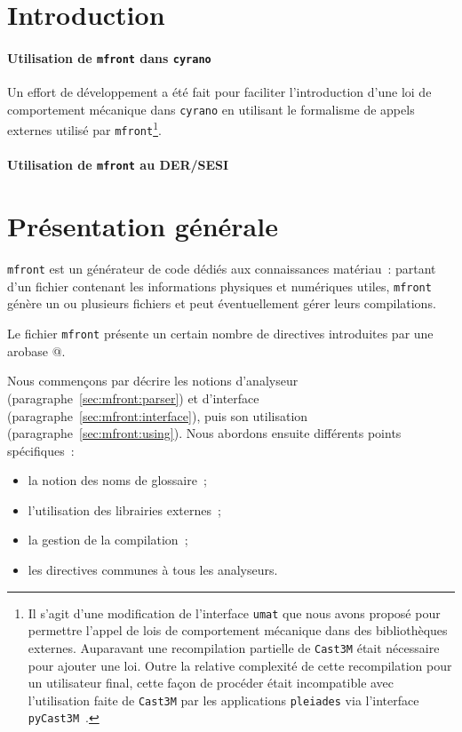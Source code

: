\documentclass[rectoverso,pleiades,pstricks,leqno,anti]{texmf/note_technique_2010}
\newcommand{\pleiades}{\texttt{pleiades}}
\newcommand{\mfront}{\texttt{mfront}}
\newcommand{\cyrano}{\texttt{cyrano}}
\newcommand{\castem}{\texttt{Cast3M}}
\newcommand{\pycastem}{\texttt{pyCast3M}}
\newcommand{\umat}{\texttt{umat}}
\def\ifmonospace{\ifdim\fontdimen3\font=0pt }
\def\cpp{%
\ifmonospace%
    C++%
\else%
    C\kern-.1667em\raise.30ex\hbox{\smaller{++}}%
\fi%
\spacefactor1000 }
\begin{document}
\clearpage
\newpage
\section{Introduction}

\paragraph{Utilisation de \mfront{} dans \cyrano{}}

Un effort de développement a été fait pour faciliter l'introduction
d'une loi de comportement mécanique dans \cyrano{} en utilisant le
formalisme de appels externes utilisé par \mfront{}\footnote{Il s'agit
d'une modification de l'interface \umat{} que nous avons proposé pour
permettre l'appel de lois de comportement mécanique dans des
bibliothèques externes. Auparavant une recompilation partielle de
\castem{} était nécessaire pour ajouter une loi. Outre la relative
complexité de cette recompilation pour un utilisateur final, cette façon
de procéder était incompatible avec l'utilisation faite de \castem{} par
les applications \pleiades{} via l'interface
\pycastem~\cite{t.06:_implan}.}.

\paragraph{Utilisation de \mfront{} au DER/SESI}

\clearpage
\newpage
\section{Présentation générale}

\mfront{} est un générateur de code dédiés aux connaissances matériau~:
partant d'un fichier contenant les informations physiques et numériques
utiles, \mfront{} génère un ou plusieurs fichiers \cpp{} et peut
éventuellement gérer leurs compilations.

Le fichier \mfront{} présente un certain nombre de directives
introduites par une arobase @.

Nous commençons par décrire les notions d'analyseur
(paragraphe~\ref{sec:mfront:parser}) et d'interface
(paragraphe~\ref{sec:mfront:interface}), puis son utilisation
(paragraphe~\ref{sec:mfront:using}). Nous abordons ensuite différents
points spécifiques~:
\begin{itemize}
  \item la notion des noms de glossaire~;
  \item l'utilisation des librairies externes~;
  \item la gestion de la compilation~;
  \item les directives communes à tous les analyseurs.
\end{itemize}
\end{document}
